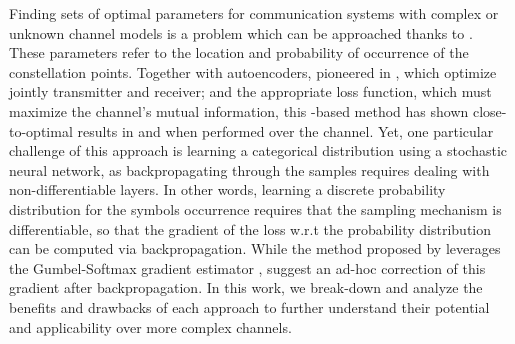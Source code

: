 \label{chap:abstract} %
Finding sets of optimal parameters for communication systems with complex or unknown channel models is a problem which can be approached thanks to . These parameters refer to the location and probability of occurrence of the constellation points. Together with autoencoders, pioneered in \citep{O'Shea}, which optimize jointly transmitter and receiver; and the appropriate loss function, which must maximize the channel's mutual information, this -based method has shown close-to-optimal results in \cite{Stark} and \cite{Aref} when performed over the  channel. Yet, one particular challenge of this approach is learning a categorical distribution using a stochastic neural network, as backpropagating through the samples requires dealing with non-differentiable layers. In other words, learning a discrete probability distribution for the symbols occurrence requires that the sampling mechanism is differentiable, so that the gradient of the loss w.r.t the probability distribution can be computed via backpropagation. While the method proposed by \citeauthor{Stark} leverages the Gumbel-Softmax gradient estimator \cite{JANG}, \citeauthor{Aref} suggest an ad-hoc correction of this gradient after backpropagation. In this work, we break-down and analyze the benefits and drawbacks of each approach to further understand their potential and applicability over more complex channels.
